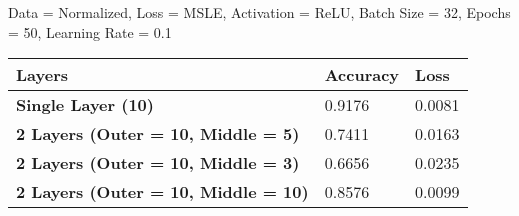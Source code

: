 \documentclass{article}
\begin{document}
Data = Normalized, Loss = MSLE, Activation = ReLU, Batch Size = 32, Epochs = 50, Learning Rate = 0.1
\begin{table}[h!]
  \begin{center}
    \label{tab:table1}
    \begin{tabular}{l|l|l} 
      \textbf{Layers} & \textbf{Accuracy} & \textbf{Loss}\\
      \hline
      \textbf{Single Layer (10)} & 0.9176 & 0.0081\\
      \textbf{2 Layers (Outer = 10, Middle = 5)} & 0.7411 & 0.0163\\
      \textbf{2 Layers (Outer = 10, Middle = 3)} & 0.6656 & 0.0235\\
      \textbf{2 Layers (Outer = 10, Middle = 10)} & 0.8576 & 0.0099\\
    \end{tabular}
  \end{center}
\end{table}
\end{document}

